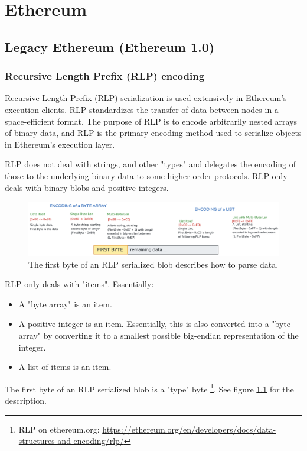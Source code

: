 
\chapter{Ethereum}

\section{Legacy Ethereum (Ethereum 1.0)}

\subsection{Recursive Length Prefix (RLP) encoding}
Recursive Length Prefix (RLP) serialization is used extensively in Ethereum's execution clients. RLP standardizes the transfer of data between nodes in a space-efficient format. The purpose of RLP is to encode arbitrarily nested arrays of binary data, and RLP is the primary encoding method used to serialize objects in Ethereum's execution layer.

RLP does not deal with strings, and other "types" and delegates the encoding of those to the underlying binary data to some higher-order protocols. RLP only deals with binary blobs and positive integers.

\begin{figure}[h]
    \centering
    \includegraphics[width=1.0\textwidth]{ethereum/assets/rlp-encoding-first-byte.png}
    \caption{The first byte of an RLP serialized blob describes how to parse data.}
    \label{fig:first-byte-rlp}
\end{figure}

RLP only deals with "items". Essentially:
\begin{itemize}
    \item A "byte array" is an item.
    \item A positive integer is an item. Essentially, this is also converted into a "byte array" by converting it to a smallest possible big-endian representation of the integer.
    \item A list of items is an item.
\end{itemize}

The first byte of an RLP serialized blob is a "type" byte \footnote{RLP on ethereum.org: \href{https://ethereum.org/en/developers/docs/data-structures-and-encoding/rlp/}{https://ethereum.org/en/developers/docs/data-structures-and-encoding/rlp/}}. See figure \ref{fig:first-byte-rlp} for the description.

